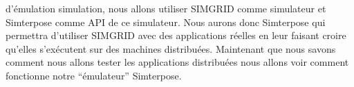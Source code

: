 d'émulation simulation, nous allons utiliser SIMGRID comme simulateur et Simterpose comme API de ce simulateur. Nous aurons donc Simterpose qui permettra d'utiliser SIMGRID avec des applications réelles en leur faisant croire qu'elles s'exécutent sur des machines distribuées. Maintenant que nous savons comment nous allons tester les applications distribuées nous allons voir comment fonctionne notre ``émulateur'' Simterpose.
